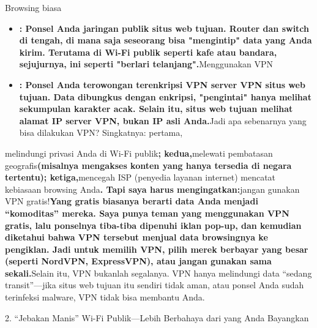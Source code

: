 


Browsing biasa

\begin{itemize}
  \item \textbf{: Ponsel Anda jaringan publik situs web tujuan. Router dan switch di tengah, di mana saja seseorang bisa "mengintip" data yang Anda kirim. Terutama di Wi-Fi publik seperti kafe atau bandara, sejujurnya, ini seperti "berlari telanjang".}Menggunakan VPN
  \item \textbf{: Ponsel Anda terowongan terenkripsi VPN server VPN situs web tujuan. Data dibungkus dengan enkripsi, "pengintai" hanya melihat sekumpulan karakter acak. Selain itu, situs web tujuan melihat alamat IP server VPN, bukan IP asli Anda.}Jadi apa sebenarnya yang bisa dilakukan VPN? Singkatnya: pertama,
\end{itemize}

melindungi privasi Anda di Wi-Fi publik\textbf{; kedua,}melewati pembatasan geografis\textbf{(misalnya mengakses konten yang hanya tersedia di negara tertentu); ketiga,}mencegah ISP (penyedia layanan internet) mencatat kebiasaan browsing Anda\textbf{. Tapi saya harus mengingatkan:}jangan gunakan VPN gratis!\textbf{Yang gratis biasanya berarti data Anda menjadi “komoditas” mereka. Saya punya teman yang menggunakan VPN gratis, lalu ponselnya tiba-tiba dipenuhi iklan pop-up, dan kemudian diketahui bahwa VPN tersebut menjual data browsingnya ke pengiklan. Jadi untuk memilih VPN, pilih merek berbayar yang besar (seperti NordVPN, ExpressVPN), atau jangan gunakan sama sekali.}Selain itu, VPN bukanlah segalanya. VPN hanya melindungi data “sedang transit”—jika situs web tujuan itu sendiri tidak aman, atau ponsel Anda sudah terinfeksi malware, VPN tidak bisa membantu Anda.

2. “Jebakan Manis” Wi-Fi Publik—Lebih Berbahaya dari yang Anda Bayangkan


